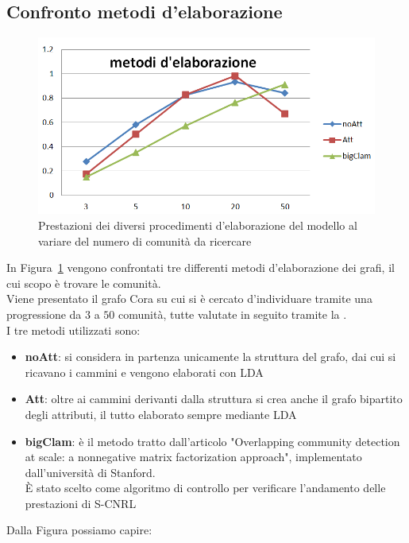 \subsection{Confronto metodi d'elaborazione}%
%
\begin{figure}[htp]
	\centering
	\includegraphics[width=\linewidth]{immagini/MOD_3_elaborazione}
	\caption{Prestazioni dei diversi procedimenti d'elaborazione del modello al variare del numero di comunità da ricercare}
	\label{fig:MOD_3_elaborazione}
\end{figure}
%
In Figura~\ref{fig:MOD_3_elaborazione} vengono confrontati tre differenti metodi d'elaborazione dei grafi, il cui scopo è trovare le comunità.\\
Viene presentato il grafo Cora su cui si è cercato d'individuare tramite una progressione da $3$ a $50$ comunità, tutte valutate in seguito tramite la \mmod. \\
I tre metodi utilizzati sono:
\begin{itemize}
	\item \textbf{noAtt}: si considera in partenza unicamente la struttura del grafo, dai cui si ricavano i cammini e vengono elaborati con LDA
	\item \textbf{Att}: oltre ai cammini derivanti dalla struttura si crea anche il grafo bipartito degli attributi, il tutto elaborato sempre mediante LDA
	\item \textbf{bigClam}: è il metodo tratto dall'articolo "Overlapping community detection at scale: a nonnegative matrix factorization approach"\cite{bigClam_paper}, implementato dall'università di Stanford\cite{bigClam_code}.\\
	È stato scelto come algoritmo di controllo per verificare l'andamento delle prestazioni di S-CNRL
\end{itemize}
Dalla Figura possiamo capire:
